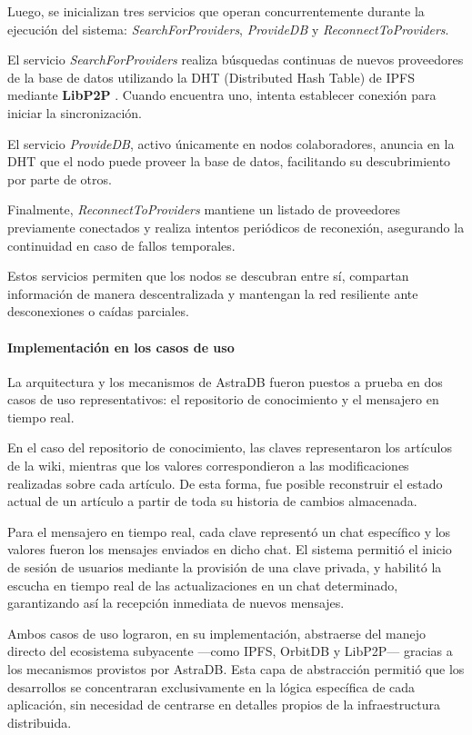 Luego, se inicializan tres servicios que operan concurrentemente durante la ejecución del sistema: \textit{SearchForProviders}, \textit{ProvideDB} y \textit{ReconnectToProviders}.

El servicio \textit{SearchForProviders} realiza búsquedas continuas de nuevos proveedores de la base de datos utilizando la DHT (Distributed Hash Table) de IPFS mediante \textbf{LibP2P} \cite{libp2p}. Cuando encuentra uno, intenta establecer conexión para iniciar la sincronización.

El servicio \textit{ProvideDB}, activo únicamente en nodos colaboradores, anuncia en la DHT que el nodo puede proveer la base de datos, facilitando su descubrimiento por parte de otros.

Finalmente, \textit{ReconnectToProviders} mantiene un listado de proveedores previamente conectados y realiza intentos periódicos de reconexión, asegurando la continuidad en caso de fallos temporales.

Estos servicios permiten que los nodos se descubran entre sí, compartan información de manera descentralizada y mantengan la red resiliente ante desconexiones o caídas parciales.

\paragraph{Implementación en los casos de uso}

La arquitectura y los mecanismos de AstraDB fueron puestos a prueba en dos casos de uso representativos: el repositorio de conocimiento y el mensajero en tiempo real.

En el caso del repositorio de conocimiento, las claves representaron los artículos de la wiki, mientras que los valores correspondieron a las modificaciones realizadas sobre cada artículo. De esta forma, fue posible reconstruir el estado actual de un artículo a partir de toda su historia de cambios almacenada.

Para el mensajero en tiempo real, cada clave representó un chat específico y los valores fueron los mensajes enviados en dicho chat. El sistema permitió el inicio de sesión de usuarios mediante la provisión de una clave privada, y habilitó la escucha en tiempo real de las actualizaciones en un chat determinado, garantizando así la recepción inmediata de nuevos mensajes.

Ambos casos de uso lograron, en su implementación, abstraerse del manejo directo del ecosistema subyacente —como IPFS, OrbitDB y LibP2P— gracias a los mecanismos provistos por AstraDB. Esta capa de abstracción permitió que los desarrollos se concentraran exclusivamente en la lógica específica de cada aplicación, sin necesidad de centrarse en detalles propios de la infraestructura distribuida.

